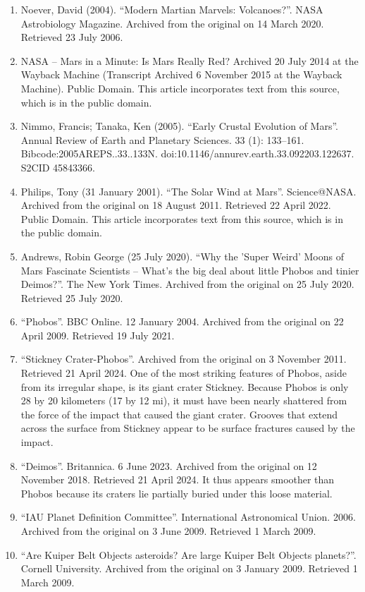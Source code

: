 \begin{enumerate}
\item Noever, David (2004). ``Modern Martian Marvels: Volcanoes?''. NASA Astrobiology Magazine. Archived from the original on 14 March 2020. Retrieved 23 July 2006.
\item NASA – Mars in a Minute: Is Mars Really Red? Archived 20 July 2014 at the Wayback Machine (Transcript Archived 6 November 2015 at the Wayback Machine). Public Domain. This article incorporates text from this source, which is in the public domain.
\item Nimmo, Francis; Tanaka, Ken (2005). ``Early Crustal Evolution of Mars''. Annual Review of Earth and Planetary Sciences. 33 (1): 133–161. Bibcode:2005AREPS..33..133N. doi:10.1146/annurev.earth.33.092203.122637. S2CID 45843366.
\item Philips, Tony (31 January 2001). ``The Solar Wind at Mars''. Science@NASA. Archived from the original on 18 August 2011. Retrieved 22 April 2022. Public Domain. This article incorporates text from this source, which is in the public domain.
\item Andrews, Robin George (25 July 2020). ``Why the 'Super Weird' Moons of Mars Fascinate Scientists – What's the big deal about little Phobos and tinier Deimos?''. The New York Times. Archived from the original on 25 July 2020. Retrieved 25 July 2020.
\item ``Phobos''. BBC Online. 12 January 2004. Archived from the original on 22 April 2009. Retrieved 19 July 2021.
\item ``Stickney Crater-Phobos''. Archived from the original on 3 November 2011. Retrieved 21 April 2024. One of the most striking features of Phobos, aside from its irregular shape, is its giant crater Stickney. Because Phobos is only 28 by 20 kilometers (17 by 12 mi), it must have been nearly shattered from the force of the impact that caused the giant crater. Grooves that extend across the surface from Stickney appear to be surface fractures caused by the impact.
\item ``Deimos''. Britannica. 6 June 2023. Archived from the original on 12 November 2018. Retrieved 21 April 2024. It thus appears smoother than Phobos because its craters lie partially buried under this loose material.
\item ``IAU Planet Definition Committee''. International Astronomical Union. 2006. Archived from the original on 3 June 2009. Retrieved 1 March 2009.
\item ``Are Kuiper Belt Objects asteroids? Are large Kuiper Belt Objects planets?''. Cornell University. Archived from the original on 3 January 2009. Retrieved 1 March 2009.

\end{enumerate}
